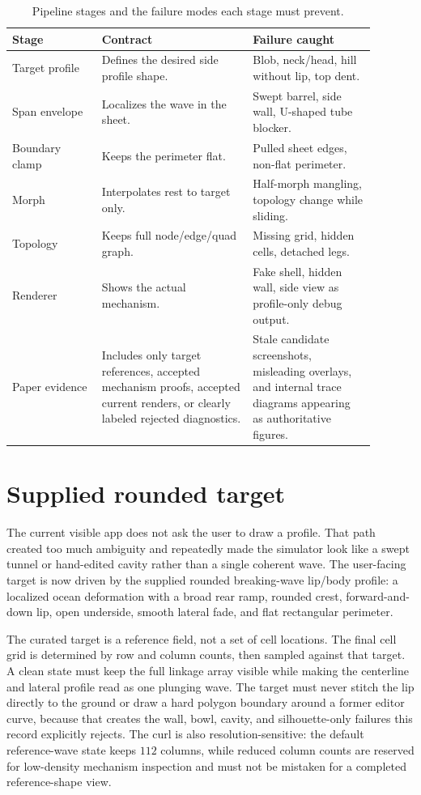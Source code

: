 \documentclass[12pt,letterpaper]{article}
\begin{document}
\begin{table}[H]
\centering
{\small
\begin{tabular}{@{}Y{0.22\linewidth}Y{0.37\linewidth}Y{0.30\linewidth}@{}}
\toprule
Stage & Contract & Failure caught \\
\midrule
Target profile & Defines the desired side profile shape. & Blob, neck/head, hill without lip, top dent. \\
Span envelope & Localizes the wave in the sheet. & Swept barrel, side wall, U-shaped tube blocker. \\
Boundary clamp & Keeps the perimeter flat. & Pulled sheet edges, non-flat perimeter. \\
Morph & Interpolates rest to target only. & Half-morph mangling, topology change while sliding. \\
Topology & Keeps full node/edge/quad graph. & Missing grid, hidden cells, detached legs. \\
Renderer & Shows the actual mechanism. & Fake shell, hidden wall, side view as profile-only debug output. \\
Paper evidence & Includes only target references, accepted mechanism proofs, accepted current renders, or clearly labeled rejected diagnostics. & Stale candidate screenshots, misleading overlays, and internal trace diagrams appearing as authoritative figures. \\
\bottomrule
\end{tabular}
}
\caption{Pipeline stages and the failure modes each stage must prevent.}
\end{table}

\section{Supplied rounded target}

The current visible app does not ask the user to draw a profile. That path created too much ambiguity and repeatedly made the simulator look like a swept tunnel or hand-edited cavity rather than a single coherent wave. The user-facing target is now driven by the supplied rounded breaking-wave lip/body profile: a localized ocean deformation with a broad rear ramp, rounded crest, forward-and-down lip, open underside, smooth lateral fade, and flat rectangular perimeter.

The curated target is a reference field, not a set of cell locations. The final cell grid is determined by row and column counts, then sampled against that target. A clean state must keep the full linkage array visible while making the centerline and lateral profile read as one plunging wave. The target must never stitch the lip directly to the ground or draw a hard polygon boundary around a former editor curve, because that creates the wall, bowl, cavity, and silhouette-only failures this record explicitly rejects. The curl is also resolution-sensitive: the default reference-wave state keeps \(112\) columns, while reduced column counts are reserved for low-density mechanism inspection and must not be mistaken for a completed reference-shape view.
\end{document}
